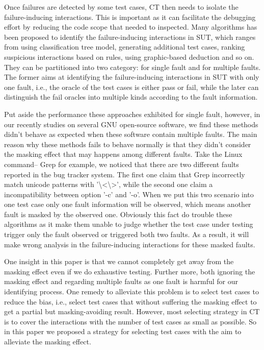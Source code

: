 \documentclass{sig-alternate}
\begin{document}
Once failures are detected by some test cases, CT then needs to isolate the failure-inducing interactions. This is important as it can facilitate the debugging effort by reducing the code scope that needed to inspected.  Many algorithms has been proposed to identify the failure-inducing interactions in SUT, which ranges from using classification tree model, generating additional test cases, ranking suspicious interactions based on rules, using graphic-based deduction and so on. They can be partitioned into two category: for single fault and for multiple faults. The former aims at identifying the failure-inducing interactions in SUT with only one fault, i.e., the oracle of the test cases is either pass or fail, while the later can distinguish the fail oracles into multiple kinds according to the fault information.

Put aside the performance these approaches exhibited for single fault, however, in our recently studies on several GNU open-source software, we find these methods didn't behave as expected when these software contain multiple faults. The main reason why these methods fails to behave normally is that they didn't consider the masking effect that may happens among different faults. Take the Linux command-- Grep for example, we noticed that there are two different faults reported in the bug tracker system. The first one claim that Grep incorrectly match unicode patterns with '\textbackslash<\textbackslash>', while the second one claim a incompatibility between option '-c' and '-o'. When we put this two scenario into one test case only one fault information will be observed, which means another fault is masked by the observed one. Obviously this fact do trouble these algorithms as it make them unable to judge whether the test case under testing trigger only the fault observed or triggered both two faults. As a result, it will make wrong analysis in the failure-inducing interactions for these masked faults.

One insight in this paper is that we cannot completely get away from the masking effect even if we do exhaustive testing. Further more, both ignoring the masking effect and regarding multiple faults as one fault is harmful for our identifying process. One remedy to alleviate this problem is to select test cases to reduce the bias, i.e., select test cases that without suffering the masking effect to get a partial but masking-avoiding result. However, most selecting strategy in CT is to cover the interactions with the number of test cases as small as possible.  So in this paper we proposed a strategy for selecting test cases with the aim to alleviate the masking effect.
\end{document}

